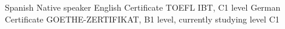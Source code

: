 \begin{cvskills}
    \cvskill
        {Spanish}
        {Native speaker}
    \cvskill
        {English}
        {Certificate TOEFL IBT, C1 level}
    \cvskill
        {German}
        {Certificate GOETHE-ZERTIFIKAT, B1 level, currently studying level C1}
\end{cvskills}
